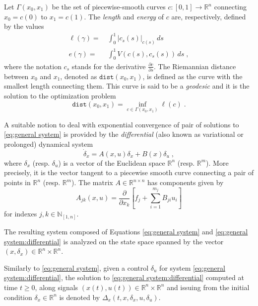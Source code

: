 \documentclass[10pt,twocolumn,twoside]{IEEEtran}
\newcounter{para}
\newcommand\mypara{\par}
\theoremstyle{plain}
\theoremstyle{definition}
\theoremstyle{remark}
\begin{document}
\mypara Let $\Gamma(x_0,x_1)$ be the set of piecewise-smooth curves $c:[0,1]\to\mathbb{R}^n$ connecting $x_0=c(0)$ to $x_1=c(1)$. The \emph{length} and \emph{energy} of $c$ are, respectively, defined by the values
\begin{align*}
	\ell(\gamma)=&\ \int_0^1\left|c_s(s)\right|_{c(s)}\,ds\\
	e(\gamma)=&\ \int_0^1 V(c(s),c_s(s))\,ds\;,
\end{align*}
where the notation $c_s$ stands for the derivative $\tfrac{\partial c}{\partial s}$. The Riemannian distance between $x_0$ and $x_1$, denoted as $\mathbin{\mathtt{dist}}(x_0,x_1)$, is defined as the curve with the smallest length connecting them. This curve is said to be a \emph{geodesic} and it is the solution to the optimization problem
\begin{equation}\label{eq:geodesic formulation}
	\mathbin{\mathtt{dist}}(x_0,x_1)=\inf_{c\in\Gamma(x_0,x_1)}\ell(c)\;.
\end{equation}

\mypara A suitable notion to deal with exponential convergence of pair of solutions to \eqref{eq:general system} is provided by the \emph{differential} (also known as variational or prolonged) dynamical system
\begin{equation}\label{eq:general system:differential}
	\dot{\delta}_x=A(x,u)\delta_x+B(x)\delta_u\;,
\end{equation}
where $\delta_x$ (resp. $\delta_u$) is a vector of the Euclidean space $\mathbb{R}^n$ (resp. $\mathbb{R}^m$). More precisely, it is the vector tangent to a piecewise smooth curve connecting a pair of points in $\mathbb{R}^n$ (resp. $\mathbb{R}^m$). The matrix $A\in\mathbb{R}^{n\times n}$ has components given by 
\begin{equation*}
	A_{jk}(x,u)=\dfrac{\partial}{\partial x_k}\left[f_j+\sum_{i=1}^{m_j} B_{ji}u_i\right]
\end{equation*}
for indexes $j,k\in\mathbb{N}_{[1,n]}$. 

\mypara The resulting system composed of Equations \eqref{eq:general system} and \eqref{eq:general system:differential} is analyzed on the state space spanned by the vector $(x,\delta_x)\in\mathbb{R}^n\times\mathbb{R}^n$. 

\mypara Similarly to \eqref{eq:general system}, given a control $\delta_u$ for system \eqref{eq:general system:differential}, the solution to \eqref{eq:general system:differential} computed at time $t\geq0$, along signals $(x(t),u(t))\in\mathbb{R}^n\times\mathbb{R}^n$ and issuing from the  initial condition $\delta_x\in\mathbb{R}^n$ is denoted by $\Delta_x(t,x,\delta_x,u,\delta_u)$. 
\end{document}
